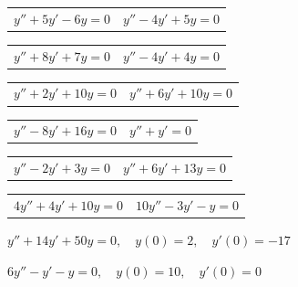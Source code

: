 \begin{exerciselist}
  \begin{tabular}[t]{@{}p{168pt}@{}p{168pt}}
    \item\label{exer:5.2.1} $y''+5y'-6y=0$ & \vspace*{10pt}
    \item\label{exer:5.2.2} $y''-4y'+5y=0$
  \end{tabular}

  \begin{tabular}[t]{@{}p{168pt}@{}p{168pt}}
    \item\label{exer:5.2.3} $y''+8y'+7y=0$ &
    \item\label{exer:5.2.4} $y''-4y'+4y=0$
  \end{tabular}

  \begin{tabular}[t]{@{}p{168pt}@{}p{168pt}}
    \item\label{exer:5.2.5} $y''+2y'+10y=0$ &
    \item\label{exer:5.2.6} $y''+6y'+10y=0$
  \end{tabular}

  \begin{tabular}[t]{@{}p{168pt}@{}p{168pt}}
    \item\label{exer:5.2.7} $y''-8y'+16y=0$ &
    \item\label{exer:5.2.8} $y''+y'=0$
  \end{tabular}

  \begin{tabular}[t]{@{}p{168pt}@{}p{168pt}}
    \item\label{exer:5.2.9} $y''-2y'+3y=0$ &
    \item\label{exer:5.2.10} $y''+6y'+13y=0$
  \end{tabular}

  \begin{tabular}[t]{@{}p{168pt}@{}p{168pt}}
    \item\label{exer:5.2.11} $4y''+4y'+10y=0$ &
    \item\label{exer:5.2.12} $10y''-3y'-y=0$
  \end{tabular}


  \item\label{exer:5.2.13} $y''+14y'+50y=0,\quad y(0)=2,\quad y'(0)=-17$

  \item\label{exer:5.2.14} $6y''-y'-y=0,\quad y(0)=10,\quad y'(0)=0$


\end{exerciselist}
